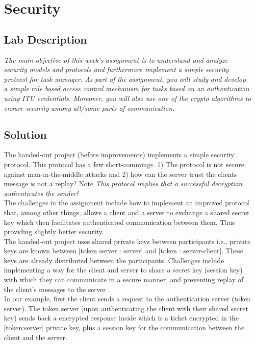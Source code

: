 \chapter{Security}
\minitoc

\section{Lab Description}
\textit{The main objective of this week's assignment is to understand and analyze security models and protocols and furthermore implement a simple security protocol for task manager. As part of the assignment, you will study and develop a simple role based access control mechanism for tasks based on an authentication using ITU credentials. Moreover, you will also use one of the crypto algorithms to ensure security among all/some parts of communication.}

\section{Solution}

The handed-out project (before improvements) implements a simple security protocol. This protocol has a few short-commings. 1) The protocol is not secure against man-in-the-middle attacks and 2) how can the server trust the clients message is not a replay? Note \textit{This protocol implies that a successful decryption authenticates the sender!} \\

The challenges in the assignment include how to implement an improved protocol that, among other things, allows a client and a server to exchange a shared secret key which then facilitates authenticated communication between them. Thus providing slightly better security.  \\

The handed-out project uses shared private keys between participants i.e., private keys are known between [token server : server] and [token : server-client]. These keys are already distributed between the participants. Challenges include implementing a way for the client and server to share a secret key (session key) with which they can communicate in a secure manner, and preventing replay of the client's messages to the server . \\

In our example, first the client sends a request to the authentication server (token server). The token server (upon authenticating the client with their shared secret key) sends back a encrypted response inside which is a ticket encrypted in the [token:server] private key, plus a session key for the communication between the client and the server. \\

